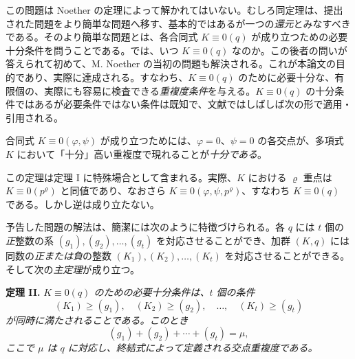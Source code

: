 この問題は Noether の定理によって解かれてはいない。むしろ同定理は、提出された問題をより簡単な問題へ移す、基本的ではあるが一つの\emph{還元}とみなすべきである。そのより簡単な問題とは、各合同式 \(K\equiv0(q)\) が成り立つための必要十分条件を問うことである。では、いつ \(K\equiv0(q)\) なのか。この後者の問いが答えられて初めて、M. Noether の当初の問題も解決される。これが本論文の目的であり、実際に達成される。すなわち、\(K\equiv0(q)\) のために必要十分な、有限個の、実際にも容易に検査できる\emph{重複度条件}を与える。\(K\equiv0(q)\) の十分条件ではあるが必要条件ではない条件は既知で、文献ではしばしば次の形で適用・引用される。

合同式 \(K\equiv0(\varphi,\psi)\) が成り立つためには、\(\varphi=0\)、\(\psi=0\) の各交点が、多項式 \(K\) において「十分」高い重複度で現れることが\emph{十分である}。

この定理は定理 I に特殊場合として含まれる。実際、\(K\) における \(\varrho\) 重点は \(K\equiv0(p^\varrho)\) と同値であり、なおさら \(K\equiv0(\varphi,\psi,p^\varrho)\)、すなわち \(K\equiv0(q)\) である。しかし逆は成り立たない。

予告した問題の解法は、簡潔には次のように特徴づけられる。各 \(q\) には \(t\) 個の\emph{正}整数の系 \((g_1),(g_2),\ldots,(g_t)\) を対応させることができ、加群 \((K,q)\) には同数の\emph{正または負}の整数 \((K_1),(K_2),\ldots,(K_t)\) を対応させることができる。そして次の\emph{主定理}が成り立つ。

\textbf{定理 II.} \emph{\(K\equiv0(q)\) のための必要十分条件は、\(t\) 個の条件}
\[
(K_1)\geq(g_1),\quad (K_2)\geq(g_2),\quad\ldots,\quad (K_t)\geq(g_t)
\]
\emph{が同時に満たされることである。このとき}
\[
(g_1)+(g_2)+\cdots+(g_t)=\mu,
\]
\emph{ここで \(\mu\) は \(q\) に対応し、終結式によって定義される交点重複度である。}

